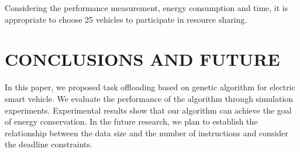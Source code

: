 \documentclass[conference]{IEEEtran}
\begin{document}

Considering the performance measurement, energy consumption and time, it is appropriate to choose 25 vehicles to participate in resource sharing. 
\section{CONCLUSIONS AND FUTURE}
In this paper, we proposed task offloading based on genetic algorithm for electric smart vehicle. We evaluate the performance of the algorithm through simulation experiments. 
Experimental results show that our algorithm can achieve the goal of energy conservation. 
In the future research, we plan to establish the relationship between the data size and the number of instructions and consider the deadline constraints.


%
\printbibliography
\end{document}
